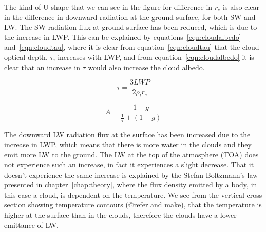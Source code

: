 The kind of U-shape that we can see in the figure for difference in $r_e$ is also clear in the difference in downward radiation at the ground surface, for both SW and LW. The SW radiation flux at ground surface has been reduced, which is due to the increase in LWP. This can be explained by equations~\ref{eqn:cloudalbedo} and~\ref{eqn:cloudtau}, where it is clear from equation~\ref{eqn:cloudtau} that the cloud optical depth, $\tau$, increases with LWP, and from equation~\ref{eqn:cloudalbedo} it is clear that an increase in $\tau$ would also increase the cloud albedo.

\begin{equation}
\tau = \frac{3LWP}{2\rho_l r_e}
\label{eqn:cloudtau}
\end{equation}

\begin{equation}
A = \frac{1-g}{\frac{1}{\tau}+(1-g)}
\label{eqn:cloudalbedo}
\end{equation}

The downward LW radiation flux at the surface has been increased due to the increase in LWP, which means that there is more water in the clouds and they emit more LW to the ground. %
The LW at the top of the atmosphere (TOA) does not experience such an increase, in fact it experiences a slight decrease. That it doesn't experience the same increase is explained by the Stefan-Boltzmann's law presented in chapter~\ref{chap:theory}, where the flux density emitted by a body, in this case a cloud, is dependent on the temperature. %
 We see from the vertical cross section showing temperature contours (@refer and make), that the temperature is higher at the surface than in the clouds, therefore the clouds have a lower emittance of LW.

